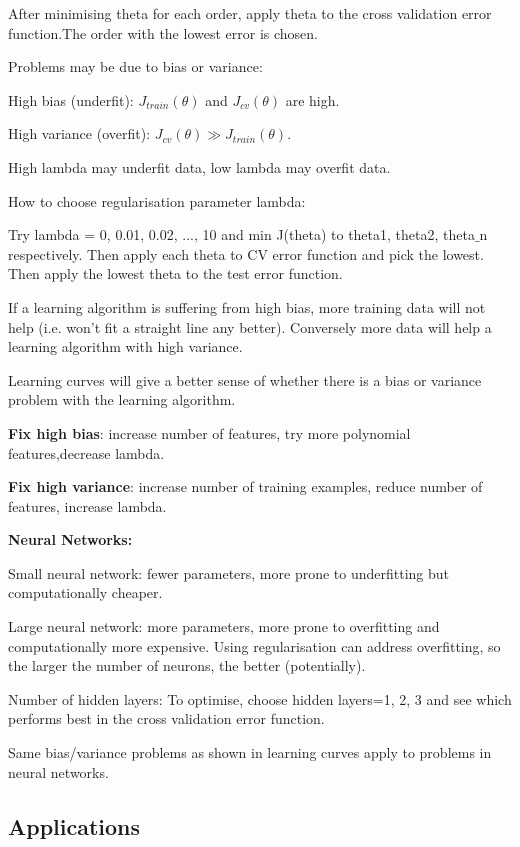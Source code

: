 \documentclass[12pt] {article}
\begin{document}
{    After minimising theta for each order, apply theta to the cross validation
     error function.The order with the lowest error is chosen. 

    Problems may be due to bias or variance:

    High bias (underfit): $J_{train}(\theta)$ and $J_{cv}(\theta)$ are high.

    High variance (overfit): $J_{cv}(\theta) \gg J_{train}(\theta)$.
    
    High lambda may underfit data, low lambda may overfit data. 
    
    How to choose regularisation parameter lambda:
    
    Try lambda = 0, 0.01, 0.02, ..., 10 and min J(theta) to theta1, theta2, 
    theta$\_$n respectively. Then apply each theta to CV error function and pick 
    the lowest. Then apply the lowest theta to the test error function. 

    If a learning algorithm is suffering from high bias, more training data will
    not help (i.e. won't fit a straight line any better). Conversely more data
    will help a learning algorithm with high variance. 

    Learning curves will give a better sense of whether there is a bias or 
    variance problem with the learning algorithm. 

    \textbf{Fix high bias}: increase number of features, try more polynomial 
    features,decrease lambda.

    \textbf{Fix high variance}: increase number of training examples, reduce 
    number of features, increase lambda. 

    \textbf{Neural Networks:}

    Small neural network: fewer parameters, more prone to underfitting but 
    computationally cheaper. 

    Large neural network: more parameters, more prone to overfitting and 
    computationally more expensive. Using regularisation can address 
    overfitting, so the larger the number of neurons, the better (potentially).

    Number of hidden layers: To optimise, choose hidden layers=1, 2, 3 and 
    see which performs best in the cross validation error function. 

    Same bias/variance problems as shown in learning curves apply to problems in
    neural networks. 
  
  \subsection{Applications}

}
\end{document}
